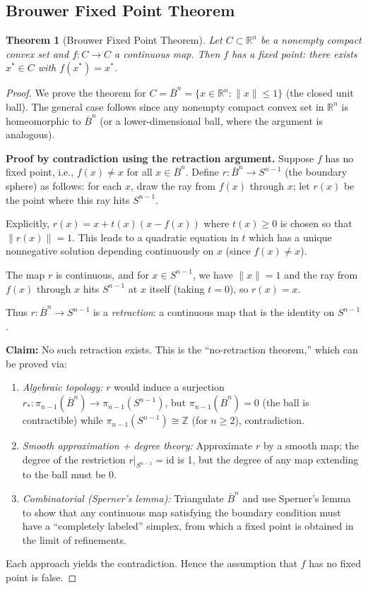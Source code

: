 \documentclass[11pt,a4paper]{article}
\theoremstyle{definition}
\theoremstyle{plain}
\newtheorem{theorem}{Theorem}[section]
\theoremstyle{remark}
\newcommand{\R}{\mathbb{R}}
\newcommand{\Z}{\mathbb{Z}}
\begin{document}
\subsection{Brouwer Fixed Point Theorem}

\begin{theorem}[Brouwer Fixed Point Theorem]\label{thm:brouwer}
Let $C \subset \R^n$ be a nonempty compact convex set and $f \colon C \to C$
a continuous map. Then $f$ has a fixed point: there exists $x^* \in C$ with
$f(x^*) = x^*$.
\end{theorem}

\begin{proof}
We prove the theorem for $C = \overline{B}^n = \{x \in \R^n : \|x\| \leq 1\}$
(the closed unit ball). The general case follows since any nonempty compact
convex set in $\R^n$ is homeomorphic to $\overline{B}^n$ (or a lower-dimensional
ball, where the argument is analogous).

\textbf{Proof by contradiction using the retraction argument.}
Suppose $f$ has no fixed point, i.e., $f(x) \neq x$ for all $x \in \overline{B}^n$.
Define $r \colon \overline{B}^n \to S^{n-1}$ (the boundary sphere) as follows:
for each $x$, draw the ray from $f(x)$ through $x$; let $r(x)$ be the point
where this ray hits $S^{n-1}$.

Explicitly, $r(x) = x + t(x)(x - f(x))$ where $t(x) \geq 0$ is chosen so
that $\|r(x)\| = 1$. This leads to a quadratic equation in $t$ which has a
unique nonnegative solution depending continuously on $x$ (since $f(x) \neq x$).

The map $r$ is continuous, and for $x \in S^{n-1}$, we have
$\|x\| = 1$ and the ray from $f(x)$ through $x$ hits $S^{n-1}$ at $x$ itself
(taking $t = 0$), so $r(x) = x$.

Thus $r \colon \overline{B}^n \to S^{n-1}$ is a \emph{retraction}: a
continuous map that is the identity on $S^{n-1}$.

\textbf{Claim:} No such retraction exists. This is the
``no-retraction theorem,'' which can be proved via:
\begin{enumerate}[leftmargin=2em]
    \item \emph{Algebraic topology:} $r$ would induce a surjection
          $r_* \colon \pi_{n-1}(\overline{B}^n) \to \pi_{n-1}(S^{n-1})$,
          but $\pi_{n-1}(\overline{B}^n) = 0$ (the ball is contractible)
          while $\pi_{n-1}(S^{n-1}) \cong \Z$ (for $n \geq 2$), contradiction.
    \item \emph{Smooth approximation + degree theory:} Approximate $r$ by a
          smooth map; the degree of the restriction $r|_{S^{n-1}} = \mathrm{id}$
          is 1, but the degree of any map extending to the ball must be 0.
    \item \emph{Combinatorial (Sperner's lemma):} Triangulate $\overline{B}^n$
          and use Sperner's lemma to show that any continuous map satisfying
          the boundary condition must have a ``completely labeled'' simplex,
          from which a fixed point is obtained in the limit of refinements.
\end{enumerate}
Each approach yields the contradiction. Hence the assumption that $f$ has no
fixed point is false.
\end{proof}
\end{document}
